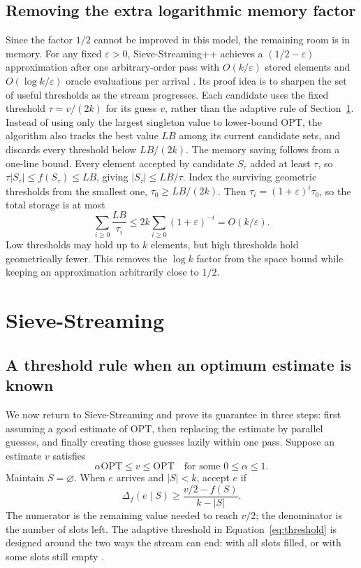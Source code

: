 \documentclass[10pt]{article}
\newcommand{\OPT}{\mathrm{OPT}}
\newcommand{\marg}[2]{\Delta_f(#1\mid #2)}
\begin{document}
\subsection{Removing the extra logarithmic memory factor}
Since the factor $1/2$ cannot be improved in this model, the remaining room is in memory. For any fixed $\varepsilon>0$, Sieve-Streaming++ achieves a $(1/2-\varepsilon)$ approximation after one arbitrary-order pass with $O(k/\varepsilon)$ stored elements and $O(\log k/\varepsilon)$ oracle evaluations per arrival \cite{kazemi2019glory}. Its proof idea is to sharpen the set of useful thresholds as the stream progresses. Each candidate uses the fixed threshold $\tau=v/(2k)$ for its guess $v$, rather than the adaptive rule of Section~\ref{sec:sieve}. Instead of using only the largest singleton value to lower-bound $\OPT$, the algorithm also tracks the best value $LB$ among its current candidate sets, and discards every threshold below $LB/(2k)$. The memory saving follows from a one-line bound. Every element accepted by candidate $S_\tau$ added at least $\tau$, so $\tau|S_\tau|\leq f(S_\tau)\leq LB$, giving $|S_\tau|\leq LB/\tau$. Index the surviving geometric thresholds from the smallest one, $\tau_0\geq LB/(2k)$. Then $\tau_i=(1+\varepsilon)^i\tau_0$, so the total storage is at most
\begin{equation*}
  \sum_{i\geq0}\frac{LB}{\tau_i}\leq2k\sum_{i\geq0}(1+\varepsilon)^{-i}=O(k/\varepsilon).
\end{equation*}
Low thresholds may hold up to $k$ elements, but high thresholds hold geometrically fewer. This removes the $\log k$ factor from the space bound while keeping an approximation arbitrarily close to $1/2$.
\section{Sieve-Streaming}
\label{sec:sieve}
\subsection{A threshold rule when an optimum estimate is known}
We now return to Sieve-Streaming and prove its guarantee in three steps: first assuming a good estimate of $\OPT$, then replacing the estimate by parallel guesses, and finally creating those guesses lazily within one pass. Suppose an estimate $v$ satisfies
\begin{equation}
  \alpha\OPT\leq v\leq\OPT
  \quad\text{for some }0\leq\alpha\leq 1.
  \label{eq:guess}
\end{equation}
Maintain $S=\varnothing$. When $e$ arrives and $|S|<k$, accept $e$ if
\begin{equation}
  \marg{e}{S}\geq\frac{v/2-f(S)}{k-|S|}.
  \label{eq:threshold}
\end{equation}
The numerator is the remaining value needed to reach $v/2$; the denominator is the number of slots left. The adaptive threshold in Equation~\eqref{eq:threshold} is designed around the two ways the stream can end: with all slots filled, or with some slots still empty \cite{badanidiyuru2014streaming}.
\end{document}
